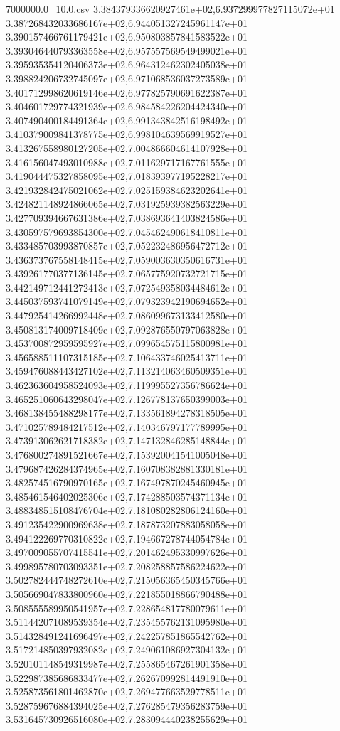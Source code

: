 \begin{filecontents*}{7000000.0_10.0.csv}
3.384379336620927461e+02,6.937299977827115072e+01
3.387268432033686167e+02,6.944051327245961147e+01
3.390157466761179421e+02,6.950803857841583522e+01
3.393046440793363558e+02,6.957557569549499021e+01
3.395935354120406373e+02,6.964312462302405038e+01
3.398824206732745097e+02,6.971068536037273589e+01
3.401712998620619146e+02,6.977825790691622387e+01
3.404601729774321939e+02,6.984584226204424340e+01
3.407490400184491364e+02,6.991343842516198492e+01
3.410379009841378775e+02,6.998104639569919527e+01
3.413267558980127205e+02,7.004866604614107928e+01
3.416156047493010988e+02,7.011629717167761555e+01
3.419044475327858095e+02,7.018393977195228217e+01
3.421932842475021062e+02,7.025159384623202641e+01
3.424821148924866065e+02,7.031925939382563229e+01
3.427709394667631386e+02,7.038693641403824586e+01
3.430597579693854300e+02,7.045462490618410811e+01
3.433485703993870857e+02,7.052232486956472712e+01
3.436373767558148415e+02,7.059003630350616731e+01
3.439261770377136145e+02,7.065775920732721715e+01
3.442149712441272413e+02,7.072549358034484612e+01
3.445037593741079149e+02,7.079323942190694652e+01
3.447925414266992448e+02,7.086099673133412580e+01
3.450813174009718409e+02,7.092876550797063828e+01
3.453700872959595927e+02,7.099654575115800981e+01
3.456588511107315185e+02,7.106433746025413711e+01
3.459476088443427102e+02,7.113214063460509351e+01
3.462363604958524093e+02,7.119995527356786624e+01
3.465251060643298047e+02,7.126778137650399003e+01
3.468138455488298177e+02,7.133561894278318505e+01
3.471025789484217512e+02,7.140346797177789995e+01
3.473913062621718382e+02,7.147132846285148844e+01
3.476800274891521667e+02,7.153920041541005048e+01
3.479687426284374965e+02,7.160708382881330181e+01
3.482574516790970165e+02,7.167497870245460945e+01
3.485461546402025306e+02,7.174288503574371134e+01
3.488348515108476704e+02,7.181080282806124160e+01
3.491235422900969638e+02,7.187873207883058058e+01
3.494122269770310822e+02,7.194667278744054784e+01
3.497009055707415541e+02,7.201462495330997626e+01
3.499895780703093351e+02,7.208258857586224622e+01
3.502782444748272610e+02,7.215056365450345766e+01
3.505669047833800960e+02,7.221855018866790488e+01
3.508555589950541957e+02,7.228654817780079611e+01
3.511442071089539354e+02,7.235455762131095980e+01
3.514328491241696497e+02,7.242257851865542762e+01
3.517214850397932082e+02,7.249061086927304132e+01
3.520101148549319987e+02,7.255865467261901358e+01
3.522987385686833477e+02,7.262670992814491910e+01
3.525873561801462870e+02,7.269477663529778511e+01
3.528759676884394025e+02,7.276285479356283759e+01
3.531645730926516080e+02,7.283094440238255629e+01

\end{filecontents*}
